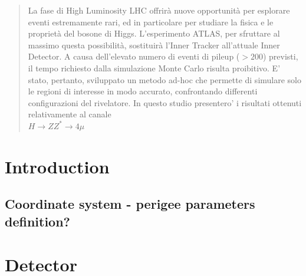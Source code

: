 \documentclass[a4paper,twoside,12pt]{article}
\begin{document}


\maketitle


\tableofcontents
\newpage

\begin{abstract}
La fase di High Luminosity LHC offrirà nuove opportunità per esplorare eventi estremamente rari, ed in particolare per studiare la fisica e le proprietà del bosone di Higgs.
L’esperimento ATLAS, per sfruttare al massimo questa possibilità, sostituirà l’Inner Tracker  all’attuale Inner Detector.
A causa dell'elevato numero di eventi di pileup ($>200$) previsti, il tempo richiesto dalla simulazione Monte Carlo risulta proibitivo. E’ stato, pertanto, sviluppato un metodo ad-hoc che permette di simulare solo le regioni di interesse in modo accurato, confrontando differenti configurazioni del rivelatore. In questo studio presentero' i risultati ottenuti relativamente al canale\\ {$H\rightarrow ZZ^*\rightarrow 4\mu$}
\end{abstract}

\newpage

\section{Introduction} \label{Introduction}
\subsection{Coordinate system - perigee parameters definition?}


\newpage

\section{Detector} \label{Detector}
\end{document}
